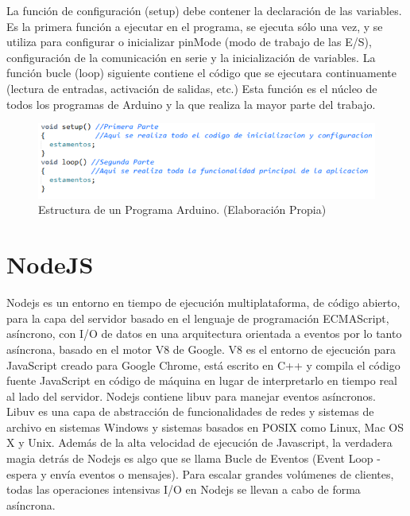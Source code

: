 \documentclass[11pt,letterpaper]{report}
\begin{document}
La función de configuración (setup) debe contener la declaración de las variables. Es la primera función a ejecutar en el programa, se ejecuta sólo una vez, y se utiliza para configurar o inicializar pinMode (modo de trabajo de las E/S), configuración de la comunicación en serie y la inicialización de variables.
La función bucle (loop) siguiente contiene el código que se ejecutara continuamente (lectura de entradas, activación de salidas, etc.) Esta función es el núcleo de todos los programas de Arduino y la que realiza la mayor parte del trabajo.
	\begin{figure}[ht]
	\centering
	\includegraphics[scale=0.7]{imagenes/ardui.png}
	\caption{Estructura de un Programa Arduino. (Elaboración Propia)}
	\label{estructuraArduino} 
	\end{figure}

	\section{NodeJS}
	Nodejs es un entorno en tiempo de ejecución multiplataforma, de código abierto, para la capa del servidor basado en el lenguaje de programación ECMAScript, asíncrono, con I/O de datos en una arquitectura orientada a eventos por lo tanto asíncrona, basado en el motor V8 de Google. V8 es el entorno de ejecución para JavaScript creado para Google Chrome, está escrito en C++ y compila el código fuente JavaScript en código de máquina en lugar de interpretarlo en tiempo real al lado del servidor. Nodejs contiene libuv para manejar eventos asíncronos. Libuv es una capa de abstracción de funcionalidades de redes y sistemas de archivo en sistemas Windows y sistemas basados en POSIX como Linux, Mac OS X y Unix.
Además de la alta velocidad de ejecución de Javascript, la verdadera magia detrás de Nodejs es algo que se llama Bucle de Eventos (Event Loop - espera y envía eventos o mensajes). Para escalar grandes volúmenes de clientes, todas las operaciones intensivas I/O en Nodejs se llevan a cabo de forma asíncrona.
\end{document}
